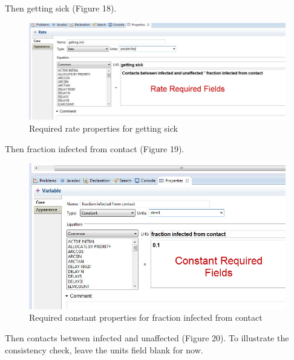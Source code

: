 \documentclass[11pt]{amsart}
\begin{document}
Then getting sick (Figure 18).


\begin{figure}[ht]
\begin{center}
\vspace{.2in}
\centerline {
\includegraphics[totalheight=0.3\textheight]{images/018.jpg}
}
\caption{Required rate properties for getting sick}
\label{fig:018}
\end{center}
\end{figure}

\clearpage

Then fraction infected from contact (Figure 19).


\begin{figure}[ht]
\begin{center}
\vspace{.2in}
\centerline {
\includegraphics[totalheight=0.3\textheight]{images/019.jpg}
}
\caption{Required constant properties for fraction infected from contact}
\label{fig:019}
\end{center}
\end{figure}

Then contacts between infected and unaffected (Figure 20). To illustrate the consistency check, leave the units field blank for now.
\end{document}
